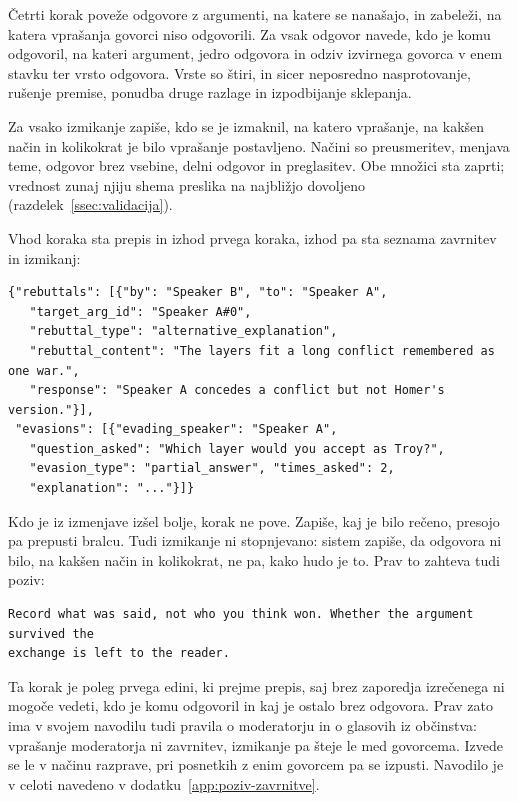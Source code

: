 \documentclass[a4paper, 12pt]{book}
\begin{document}
Četrti korak poveže odgovore z argumenti, na katere se nanašajo, in zabeleži, na
katera vprašanja govorci niso odgovorili. Za vsak odgovor navede, kdo je komu
odgovoril, na kateri argument, jedro odgovora in odziv izvirnega govorca v enem
stavku ter vrsto odgovora. Vrste so štiri, in sicer neposredno nasprotovanje,
rušenje premise, ponudba druge razlage in izpodbijanje sklepanja.

Za vsako izmikanje zapiše, kdo se je izmaknil, na katero vprašanje, na kakšen
način in kolikokrat je bilo vprašanje postavljeno. Načini so preusmeritev,
menjava teme, odgovor brez vsebine, delni odgovor in preglasitev. Obe množici
sta zaprti; vrednost zunaj njiju shema preslika na najbližjo dovoljeno
(razdelek~\ref{ssec:validacija}).

Vhod koraka sta prepis in izhod prvega koraka, izhod pa sta seznama zavrnitev in
izmikanj:

\begin{lstlisting}[basicstyle=\ttfamily\scriptsize,breaklines=true]
{"rebuttals": [{"by": "Speaker B", "to": "Speaker A",
   "target_arg_id": "Speaker A#0",
   "rebuttal_type": "alternative_explanation",
   "rebuttal_content": "The layers fit a long conflict remembered as one war.",
   "response": "Speaker A concedes a conflict but not Homer's version."}],
 "evasions": [{"evading_speaker": "Speaker A",
   "question_asked": "Which layer would you accept as Troy?",
   "evasion_type": "partial_answer", "times_asked": 2,
   "explanation": "..."}]}
\end{lstlisting}

Kdo je iz izmenjave izšel bolje, korak ne pove. Zapiše, kaj je bilo rečeno,
presojo pa prepusti bralcu. Tudi izmikanje ni stopnjevano: sistem zapiše, da
odgovora ni bilo, na kakšen način in kolikokrat, ne pa, kako hudo je to. Prav to
zahteva tudi poziv:

\begin{lstlisting}[basicstyle=\ttfamily\scriptsize,breaklines=true]
Record what was said, not who you think won. Whether the argument survived the
exchange is left to the reader.
\end{lstlisting}

Ta korak je poleg prvega edini, ki prejme prepis, saj brez zaporedja izrečenega
ni mogoče vedeti, kdo je komu odgovoril in kaj je ostalo brez odgovora. Prav
zato ima v svojem navodilu tudi pravila o moderatorju in o glasovih iz
občinstva: vprašanje moderatorja ni zavrnitev, izmikanje pa šteje le med
govorcema. Izvede se le v načinu razprave, pri posnetkih z enim govorcem pa se
izpusti. Navodilo je v celoti navedeno v dodatku~\ref{app:poziv-zavrnitve}.
\end{document}
